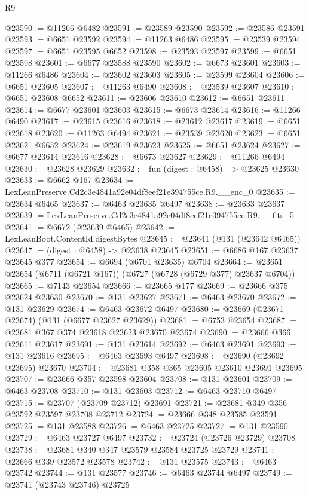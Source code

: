 \begin{lexlean}{R9}
\begin{coremodule}
@23590 := @11266 @6482
@23591 := @23589 @23590
@23592 := @23586 @23591
@23593 := @6651 @23592
@23594 := @11263 @6486
@23595 := @23539 @23594
@23597 := @6651 @23595 @6652
@23598 := @23593 @23597
@23599 := @6651 @23598
@23601 := @6677 @23588 @23590
@23602 := @6673 @23601
@23603 := @11266 @6486
@23604 := @23602 @23603
@23605 := @23599 @23604
@23606 := @6651 @23605
@23607 := @11263 @6490
@23608 := @23539 @23607
@23610 := @6651 @23608 @6652
@23611 := @23606 @23610
@23612 := @6651 @23611
@23614 := @6677 @23601 @23603
@23615 := @6673 @23614
@23616 := @11266 @6490
@23617 := @23615 @23616
@23618 := @23612 @23617
@23619 := @6651 @23618
@23620 := @11263 @6494
@23621 := @23539 @23620
@23623 := @6651 @23621 @6652
@23624 := @23619 @23623
@23625 := @6651 @23624
@23627 := @6677 @23614 @23616
@23628 := @6673 @23627
@23629 := @11266 @6494
@23630 := @23628 @23629
@23632 := fun (digest : @6458) => @23625 @23630
@23633 := @6662 @167
@23634 := LexLeanPreserve.Cd2c3e4841a92e04df8eef21e394755ce.R9.__enc_0
@23635 := @23634 @6465
@23637 := @6463 @23635 @6497
@23638 := @23633 @23637
@23639 := LexLeanPreserve.Cd2c3e4841a92e04df8eef21e394755ce.R9.__fits_5
@23641 := @6672 (@23639 @6465)
@23642 := LexLeanBoot.ContentId.digestBytes
@23645 := @23641 (@131 (@23642 @6465))
@23647 := (digest : @6458) -> @23638 @23645
@23651 := @6686 @167 @23637 @23645 @377
@23654 := @6694 (@6701 @23635) @6704
@23664 := @23651 @23654 (@6711 (@6721 @167)) (@6727 (@6728 (@6729 @377) @23637 @6704))
@23665 := @7143 @23654
@23666 := @23665 @177
@23669 := @23666 @375 @23624 @23630
@23670 := @131 @23627
@23671 := @6463 @23670
@23672 := @131 @23629
@23674 := @6463 @23672 @6497
@23680 := @23669 (@23671 @23674) (@131 (@6677 @23627 @23629))
@23681 := @6753 @23654
@23687 := @23681 @367 @374 @23618 @23623 @23670 @23674
@23690 := @23666 @366 @23611 @23617
@23691 := @131 @23614
@23692 := @6463 @23691
@23693 := @131 @23616
@23695 := @6463 @23693 @6497
@23698 := @23690 (@23692 @23695) @23670
@23704 := @23681 @358 @365 @23605 @23610 @23691 @23695
@23707 := @23666 @357 @23598 @23604
@23708 := @131 @23601
@23709 := @6463 @23708
@23710 := @131 @23603
@23712 := @6463 @23710 @6497
@23715 := @23707 (@23709 @23712) @23691
@23721 := @23681 @349 @356 @23592 @23597 @23708 @23712
@23724 := @23666 @348 @23585 @23591
@23725 := @131 @23588
@23726 := @6463 @23725
@23727 := @131 @23590
@23729 := @6463 @23727 @6497
@23732 := @23724 (@23726 @23729) @23708
@23738 := @23681 @340 @347 @23579 @23584 @23725 @23729
@23741 := @23666 @339 @23572 @23578
@23742 := @131 @23575
@23743 := @6463 @23742
@23744 := @131 @23577
@23746 := @6463 @23744 @6497
@23749 := @23741 (@23743 @23746) @23725

\end{coremodule}
\end{lexlean}
